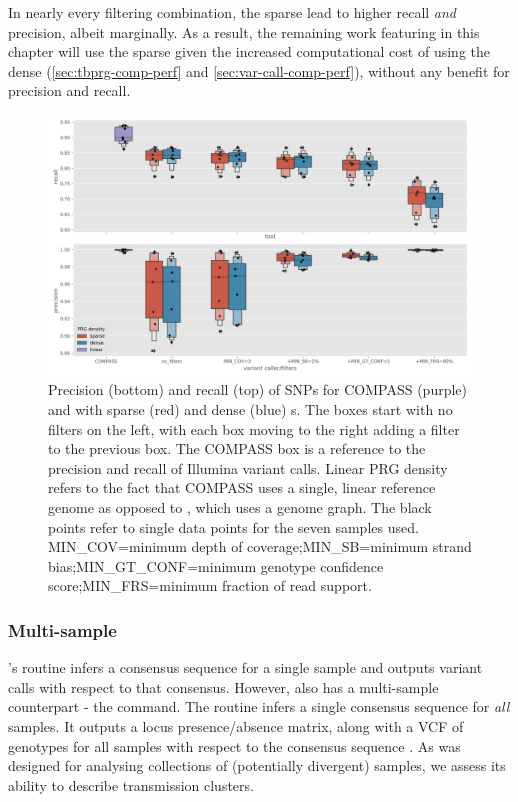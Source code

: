In nearly every filtering combination, the sparse \prg{} lead to higher recall \emph{and} precision, albeit marginally. As a result, the remaining work featuring \pandora{} in this chapter will use the sparse \prg{} given the increased computational cost of using the dense \prg{} (\autoref{sec:tbprg-comp-perf} and \autoref{sec:var-call-comp-perf}), without any benefit for precision and recall.

\begin{figure}
\begin{center}
\includegraphics[width=0.90\columnwidth]{Chapter2/Figs/pandora-precision-recall-filters-snps.png}
\caption{{Precision (bottom) and recall (top) of SNPs for COMPASS (purple) and \pandora{} with sparse (red) and dense (blue) \prg{}s. The \pandora{} boxes start with no filters on the left, with each box moving to the right adding a filter to the previous box. The COMPASS box is a reference to the precision and recall of Illumina variant calls. Linear PRG density refers to the fact that COMPASS uses a single, linear reference genome as opposed to \pandora{}, which uses a genome graph. The black points refer to single data points for the seven samples used. MIN\_COV=minimum depth of coverage;MIN\_SB=minimum strand bias;MIN\_GT\_CONF=minimum genotype confidence score;MIN\_FRS=minimum fraction of read support.
{\label{fig:pandora-filters-snps}}%
}}
\end{center}
\end{figure}

\subsubsection{Multi-sample}

\pandora{}'s  routine infers a consensus sequence for a single sample and outputs variant calls with respect to that consensus. However, \pandora{} also has a multi-sample counterpart - the  command. The \compare{} routine infers a single consensus sequence for \emph{all} samples. It outputs a locus presence/absence matrix, along with a VCF of genotypes for all samples with respect to the consensus sequence . As \compare{} was designed for analysing collections of (potentially divergent) samples, we assess its ability to describe \mtb{} transmission clusters. 

